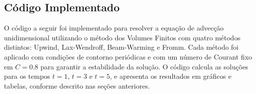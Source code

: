 \subsection{Código Implementado}

O código a seguir foi implementado para resolver a equação de advecção unidimensional utilizando o método dos Volumes Finitos com quatro métodos distintos: Upwind, Lax-Wendroff, Beam-Warming e Fromm. Cada método foi aplicado com condições de contorno periódicas e com um número de Courant fixo em \( C = 0.8 \) para garantir a estabilidade da solução. O código calcula as soluções para os tempos \( t = 1 \), \( t = 3 \) e \( t = 5 \), e apresenta os resultados em gráficos e tabelas, conforme descrito nas seções anteriores.


